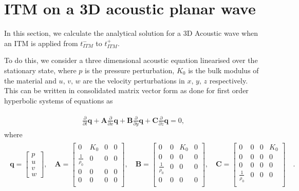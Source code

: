\section{\texorpdfstring{\ac{ITM}}{ITM} on a 3D acoustic planar wave}\label{section:3DITMAcoustic}
In this section, we calculate the analytical solution for a 3D Acoustic wave when an \ac{ITM} is applied from $t_{ITM}^-$ to $t_{ITM}^+$.

To do this, we consider a three dimensional acoustic equation linearised over the stationary state, where $p$ is the pressure perturbation, $K_0$ is the bulk
modulus of the material and $u,\,v,\,w$ are the velocity perturbations in $x,\,y,\,z$ respectively. This can be written in consolidated matrix vector form as done for first order hyperbolic systems of equations as

\begin{align}
    \begin{split}
        \frac{\partial}{\partial t}\mathbf{q} + \mathbf{A}\frac{\partial}{\partial x}\mathbf{q} + \mathbf{B}\frac{\partial}{\partial y}\mathbf{q} + 
        \mathbf{C}\frac{\partial}{\partial z}\mathbf{q} = 0,
    \end{split}
    \label{eq:3Dacoustic}
\end{align}
where
\begin{align}
    \begin{split}
        \mathbf{q} = \begin{bmatrix}
            p \\
            u \\
            v \\
            w 
        \end{bmatrix}, \quad
        \mathbf{A} = \begin{bmatrix}
            0 & K_0 & 0 & 0 \\
            \frac{1}{\rho_0} & 0 & 0 & 0 \\
            0 & 0 & 0 & 0 \\
            0 & 0 & 0 & 0 \\
        \end{bmatrix}, \quad
        \mathbf{B} = \begin{bmatrix}
            0 & 0 & K_0 & 0 \\
            0 & 0 & 0 & 0 \\
            \frac{1}{\rho_0} & 0 & 0 & 0 \\
            0 & 0 & 0 & 0 \\
        \end{bmatrix}, \quad
        \mathbf{C} = \begin{bmatrix}
            0 & 0 & 0 & K_0 \\
            0 & 0 & 0 & 0 \\
            0 & 0 & 0 & 0 \\
            \frac{1}{\rho_0} & 0 & 0 & 0 \\
        \end{bmatrix} \quad .
    \end{split}
\end{align}

